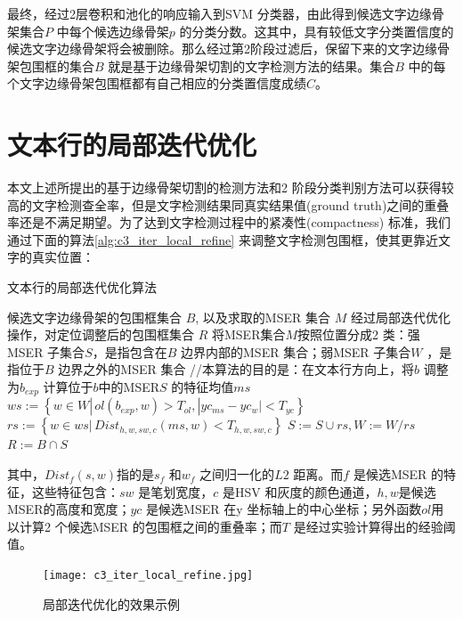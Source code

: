         最终，经过2层卷积和池化的响应输入到SVM 分类器，由此得到候选文字边缘骨架集合$P$ 中每个候选边缘骨架$p$ 的分类分数。这其中，具有较低文字分类置信度的候选文字边缘骨架将会被删除。那么经过第2阶段过滤后，保留下来的文字边缘骨架包围框的集合$B$ 就是基于边缘骨架切割的文字检测方法的结果。集合$B$ 中的每个文字边缘骨架包围框都有自己相应的分类置信度成绩$C$。

    \section{文本行的局部迭代优化}

    本文上述所提出的基于边缘骨架切割的检测方法和2 阶段分类判别方法可以获得较高的文字检测查全率，但是文字检测结果同真实结果值(ground truth)之间的重叠率还是不满足期望。为了达到文字检测过程中的紧凑性(compactness) 标准，我们通过下面的算法\ref{alg:c3_iter_local_refine} 来调整文字检测包围框，使其更靠近文字的真实位置：

    \begin{algorithm}[!h]
	\renewcommand{\algorithmicrequire}{\textbf{输入：}}
	\renewcommand{\algorithmicensure}{\textbf{输出：}}
	\caption{文本行的局部迭代优化算法}
	\label{alg:c3_iter_local_refine}
	\begin{algorithmic}[1]
		\REQUIRE 候选文字边缘骨架的包围框集合 $B$, 以及求取的MSER 集合 $M$
		\ENSURE 经过局部迭代优化操作，对定位调整后的包围框集合 $R$
		\STATE 将MSER集合$M$按照位置分成2 类：强MSER 子集合$S$，是指包含在$B$ 边界内部的MSER 集合；弱MSER 子集合$W$ ，是指位于$B$ 边界之外的MSER 集合
        \STATE //本算法的目的是：在文本行方向上，将$b$ 调整为$b_{exp}$
        \STATE 计算位于$b$中的MSER$S$ 的特征均值$ms$
		\REPEAT
        \STATE $ws:=\left\{ w \in W |\,ol(b_{exp},w)>T_{ol}, | yc_{ms}-yc_w|<T_{yc} \right\}$
        \STATE $rs:=\left\{ w \in ws |\,Dist_{h,w,sw,c}(ms,w)<T_{h,w,sw,c} \right\}$
        \STATE $S:=S\cup rs,W:=W / rs$
        \STATE $R:=B \cap S$
        \ENDFOR
	\end{algorithmic}
    \end{algorithm}

    其中，$Dist_f(s,w)$指的是$s_f$ 和$w_f$ 之间归一化的$L2$ 距离。而$f$ 是候选MSER 的特征，这些特征包含：$sw$ 是笔划宽度，$c$ 是HSV 和灰度的颜色通道，$h,w$是候选MSER的高度和宽度；$yc$ 是候选MSER 在y 坐标轴上的中心坐标；另外函数$ol$用以计算2 个候选MSER 的包围框之间的重叠率；而$T$ 是经过实验计算得出的经验阈值。

    \begin{figure}[!h]
    \centering
    \texttt{[image: c3\_iter\_local\_refine.jpg]} \caption{局部迭代优化的效果示例}
    \label{fig.c3_iter_local_refine}
    \end{figure}

